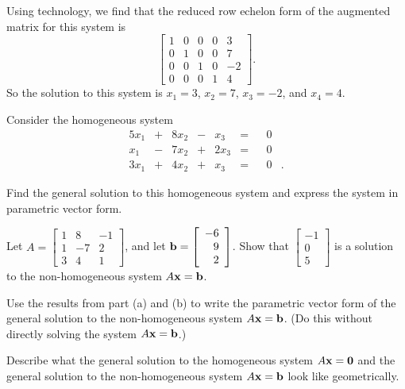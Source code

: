 \begin{example}
Using technology, we find that the reduced row echelon form of the augmented matrix for this system is 
\[\left[ \begin{array}{cccc|r} 1&0&0&0&3 \\ 0&1&0&0&7 \\ 0&0&1&0&-2  \\ 0&0&0&1&4 \end{array} \right].\]
So the solution to this system is $x_1 = 3$, $x_2 = 7$, $x_3 = -2$, and $x_4 = 4$. 


\end{example}

\begin{example} Consider the homogeneous system
\begin{alignat*}{5}
{}x_1		&{}+{} 	&{8}x_2	 &{}-{}	&{}x_3 		&= &{} &0&{} \\
{}x_1 	&{}-{} 	&{7}x_2 	&{}+{}	&{2}x_3 		&= &{} &0&{} \\
{3}x_1 	&{}+{} 	&{4}x_2 	&{}+{}	&{}x_3 		&= &{} &0&{.} 
\end{alignat*}
\ba
\item Find the general solution to this homogeneous system and express the system in parametric vector form. 

\item Let $A = \left[ \begin{array}{crr} 1&8&-1 \\ 1&-7&2 \\ 3&4&1 \end{array} \right]$, and let $\mathbf{b} = \left[ \begin{array}{r} -6\\9\\2 \end{array} \right]$. Show that $\left[ \begin{array}{r} -1\\0\\5 \end{array} \right]$ is a solution to the non-homogeneous system $A \mathbf{x} = \mathbf{b}$. 

\item Use the results from part (a) and (b) to write the parametric vector form of the general solution to the non-homogeneous system $A \mathbf{x} = \mathbf{b}$. (Do this without directly solving the system $A \mathbf{x} = \mathbf{b}$.) 

\item Describe what the general solution to the homogeneous system $A \mathbf{x} = \mathbf{0}$ and the general solution to the non-homogeneous system $A \mathbf{x} = \mathbf{b}$ look like geometrically. 


\end{example}
